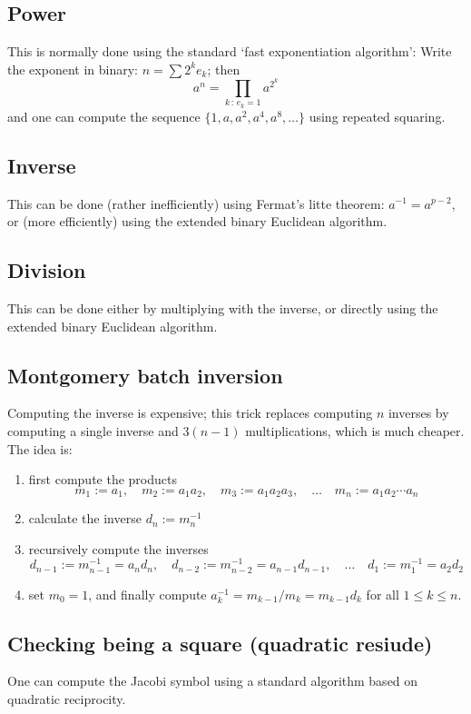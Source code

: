 \documentclass[12pt,draft,a4paper,openany,oneside]{amsbook}
\theoremstyle{plain}
\theoremstyle{definition}
\begin{document}
\subsection{Power}
This is normally done using the standard `fast exponentiation algorithm':
Write the exponent in binary: $n=\sum 2^k e_k$; then 
\[ a^n = \prod_{k\,:\,e_k=1} a^{2^{k}} \]
and one can compute the sequence $\{1,a,a^2,a^4,a^8,\dots\}$ using repeated
squaring.

\subsection{Inverse}
This can be done (rather inefficiently) using Fermat's litte theorem:
$a^{-1} = a^{p-2}$, or (more efficiently) using the extended binary 
Euclidean algorithm.

\subsection{Division}
This can be done either by multiplying with the inverse, or directly using
the extended binary Euclidean algorithm.

\subsection{Montgomery batch inversion}
Computing the inverse is expensive; this trick replaces computing $n$ inverses
by computing a single inverse and $3(n-1)$ multiplications, which is much cheaper.
The idea is:
\begin{enumerate}
\item first compute the products 
\[ m_1:=a_1 ,\quad m_2:=a_1a_2 ,\quad m_3:=a_1a_2a_3 ,\quad \dots\quad m_n:=a_1a_2\cdots a_n \]
\item calculate the inverse $d_n:=m_n^{-1}$
\item recursively compute the inverses 
\[ d_{n-1}:=m_{n-1}^{-1}=a_nd_n ,\quad 
   d_{n-2}:=m_{n-2}^{-1}=a_{n-1}d_{n-1} ,\quad
   \dots \quad
   d_1:=m_1^{-1} = a_2d_2
  \]
\item set $m_0=1$, and finally compute $a_k^{-1} = m_{k-1}/m_{k} = m_{k-1}d_{k}$ for all $1\le k\le n$.
\end{enumerate}

\subsection{Checking being a square (quadratic resiude)}
One can compute the Jacobi symbol using a standard algorithm based
on quadratic reciprocity.
\end{document}
